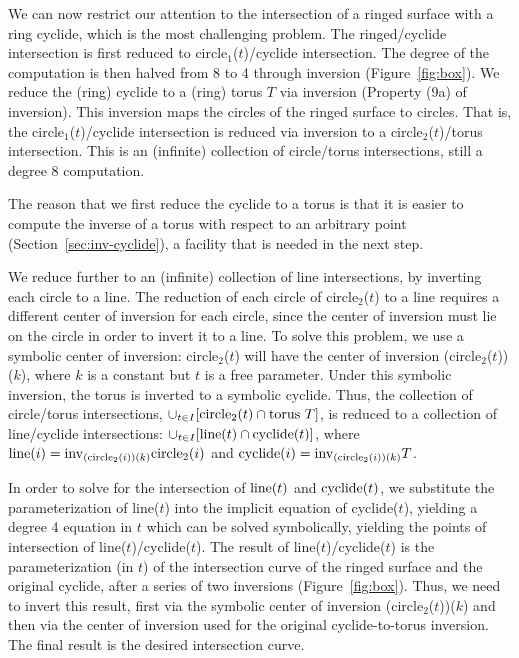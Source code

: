 We can now restrict our attention to the
intersection of a ringed surface with a ring cyclide, which is the most
challenging problem.
The ringed/cyclide intersection 
is first reduced to circle$_1$($t$)/cyclide intersection.
The degree of the computation is then halved from 8 to 4 through inversion
(Figure~\ref{fig:box}).
We reduce the (ring) cyclide to a (ring) torus $T$ via inversion
(Property (9a) of inversion).
This inversion maps the circles of the ringed surface to circles.
That is, the circle$_1$($t$)/cyclide intersection is reduced via inversion
to a circle$_2$($t$)/torus intersection.
This is an (infinite) collection of circle/torus intersections,
still a degree 8 computation.

\begin{rmk}
The reason that we first reduce the cyclide to a torus 
is that it is easier to compute the inverse of a torus with respect to an
arbitrary point (Section~\ref{sec:inv-cyclide}), 
a facility that is needed in the next step.
\end{rmk}


We reduce further to an (infinite) collection of 
line intersections, by inverting each circle to a line.
The reduction of each circle of circle$_2$($t$) to a line
requires a different center of inversion for each circle, 
since the center of inversion must lie on the circle in order to invert it
to a line.
To solve this problem, 
we use a symbolic center of inversion: circle$_2$($t$) 
will have the center of inversion (circle$_2$($t$))($k$), 
where $k$ is a constant but $t$ is a free parameter.
Under this symbolic inversion, the torus is inverted to a symbolic cyclide.
Thus, the collection of circle/torus intersections,
$\cup_{t \in I} [{\rm circle}_{2}(t) \cap {\rm torus}\ T]$,
is reduced to a collection of line/cyclide intersections: 
$\cup_{t \in I} [{\rm line}(t) \cap {\rm cyclide}(t)]$,
where ${\rm line}(i) = {\rm inv}_{({\rm circle}_{2}(i))(k)}{\rm circle}_{2}(i)$
and ${\rm cyclide}(i) = {\rm inv}_{({\rm circle}_{2}(i))(k)} T$.

In order to solve for the intersection of ${\rm line}(t)$ and
${\rm cyclide}(t)$, we substitute the parameterization of line($t$) into the
implicit equation of cyclide($t$), yielding a degree 4 equation in $t$
which can be solved symbolically, yielding the points of intersection
of line($t$)/cyclide($t$).
The result of line($t$)/cyclide($t$) 
is the parameterization (in $t$) of the intersection curve of the ringed
surface and the original cyclide, after a series of two inversions
(Figure~\ref{fig:box}).
Thus, we need to invert this result,
first via the symbolic center of inversion (circle$_2$($t$))($k$)
and then via the center of inversion used for 
the original cyclide-to-torus inversion.
The final result is the desired intersection curve.


